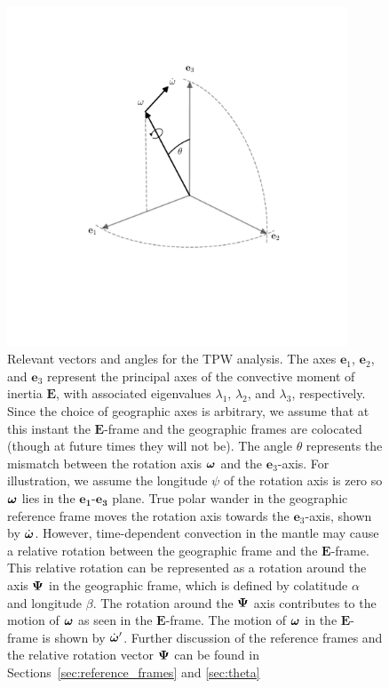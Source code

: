 \documentclass[extra,mreferee]{gji}
\begin{document}
\begin{figure}
\centering
\includegraphics[width=0.9\textwidth]{figures/reference_frames.pdf}
\caption{Relevant vectors and angles for the TPW analysis. The axes $\mathbf{e}_1$, $\mathbf{e}_2$, and $\mathbf{e}_3$ represent the principal axes of the convective moment of inertia $\mathbf{E}$, with associated eigenvalues $\lambda_1$, $\lambda_2$, and $\lambda_3$, respectively. Since the choice of geographic axes is arbitrary, we assume that at this instant the $\mathbf{E}$-frame and the geographic frames are colocated (though at future times they will not be). The angle $\theta$ represents the mismatch between the rotation axis $\mitbf{\omega}$ and the $\mathbf{e}_3$-axis. For illustration, we assume the longitude $\psi$ of the rotation axis is zero so $\mitbf{\omega}$ lies in the $\mathbf{e_1}$-$\mathbf{e_3}$ plane. True polar wander in the geographic reference frame moves the rotation axis towards the $\mathbf{e}_3$-axis, shown by $\dot{\mitbf{\omega}}$. However, time-dependent convection in the mantle may cause a relative rotation between the geographic frame and the $\mathbf{E}$-frame. This relative rotation can be represented as a rotation around the axis $\mitbf{\Psi}$ in the geographic frame, which is defined by colatitude $\alpha$ and longitude $\beta$. The rotation around the $\mitbf{\Psi}$ axis contributes to the motion of $\mitbf{\omega}$ as seen in the $\mathbf{E}$-frame. The motion of $\mitbf{\omega}$ in the $\mathbf{E}$-frame is shown by $\dot{\mitbf{\omega}}^\prime$. Further discussion of the reference frames and the relative rotation vector $\mitbf{\Psi}$ can be found in Sections~\ref{sec:reference_frames} and \ref{sec:theta}}
\label{fig:reference_frames}
\end{figure}
\end{document}
